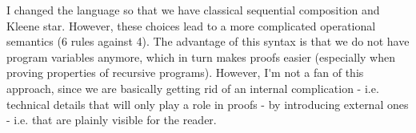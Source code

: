 \ac{I changed the language so that we have classical sequential composition and Kleene star. 
However, these choices lead to a more complicated operational semantics (6 rules against 4). 
The advantage of this syntax is that we do not have program variables anymore, which in turn makes proofs 
easier (especially when proving properties of recursive programs). 
However, I'm not a fan of this approach, since we are basically getting rid of an internal 
complication - i.e. technical details that will only play a role in proofs - by introducing external 
ones - i.e. that are plainly visible for the reader.}
%
